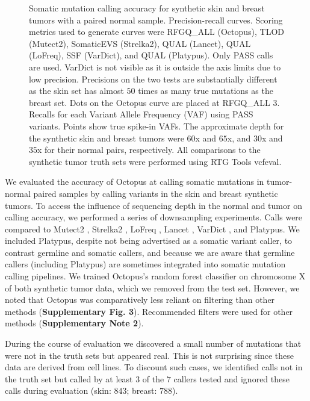 \documentclass[notitlepage, twocolumn, 10pt]{article}
\begin{document}
\begin{figure}[ht!]
\begin{subfigure}[b]{\textwidth}
    \end{subfigure}
    \vspace{-1.0cm}
    \caption{Somatic mutation calling accuracy for synthetic skin and breast tumors with a paired normal sample.  \protect{} Precision-recall curves. Scoring metrics used to generate curves were RFGQ\_ALL (Octopus), TLOD (Mutect2), SomaticEVS (Strelka2), QUAL (Lancet), QUAL (LoFreq), SSF (VarDict), and QUAL (Platypus). Only PASS calls are used. VarDict is not visible as it is outside the axis limits due to low precision. Precisions on the two tests are substantially different as the skin set has almost $50$ times as many true mutations as the breast set. Dots on the Octopus curve are placed at RFGQ\_ALL 3. \protect{} Recalls for each Variant Allele Frequency (VAF) using PASS variants. Points show true spike-in VAFs. The approximate depth for the synthetic skin and breast tumors were $60$x and $65$x, and $30$x and $35$x for their normal pairs, respectively. All comparisons to the synthetic tumor truth sets were performed using RTG Tools vcfeval.}
    \label{fig:paired-somatic-eval}
\end{figure}

We evaluated the accuracy of Octopus at calling somatic mutations in tumor-normal paired samples by calling variants in the skin and breast synthetic tumors. To access the influence of sequencing depth in the normal and tumor on calling accuracy, we performed a series of downsampling experiments. Calls were compared to Mutect2 \cite{RN142}, Strelka2 \cite{RN604}, LoFreq \cite{RN601}, Lancet \cite{RN600}, VarDict \cite{RN544}, and Platypus. We included Platypus, despite not being advertised as a somatic variant caller, to contrast germline and somatic callers, and because we are aware that germline callers (including Platypus) are sometimes integrated into somatic mutation calling pipelines. We trained Octopus's random forest classifier on chromosome X of both synthetic tumor data, which we removed from the test set. However, we noted that Octopus was comparatively less reliant on filtering than other methods (\textbf{Supplementary Fig. 3}). Recommended filters were used for other methods (\textbf{Supplementary Note 2}).

During the course of evaluation we discovered a small number of mutations that were not in the truth sets but appeared real. This is not surprising since these data are derived from cell lines. To discount such cases, we identified calls not in the truth set but called by at least $3$ of the $7$ callers tested and ignored these calls during evaluation (skin: $843$; breast: $788$).
\end{document}
